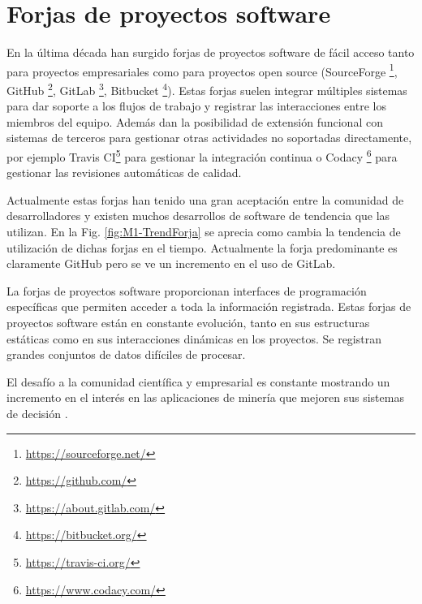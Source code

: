 \section{Forjas de proyectos software}

En la última década han surgido forjas de proyectos software de fácil acceso tanto para proyectos empresariales como para proyectos open source (SourceForge \footnote{\url{https://sourceforge.net/}}, GitHub \footnote{\url{https://github.com/}}, GitLab \footnote{\url{https://about.gitlab.com/}}, Bitbucket  \footnote{\url{https://bitbucket.org/}}).  Estas forjas suelen integrar múltiples sistemas para dar soporte a los flujos de trabajo y registrar las interacciones entre los miembros del equipo. Además dan la posibilidad de extensión funcional con sistemas de terceros para gestionar otras actividades no soportadas directamente, por ejemplo Travis CI\footnote{\url{https://travis-ci.org/}} para gestionar la integración continua o Codacy \footnote{\url{https://www.codacy.com/}} para gestionar las revisiones automáticas de calidad.

Actualmente estas forjas han tenido una gran aceptación entre la comunidad de desarrolladores y existen muchos desarrollos de software de tendencia que las utilizan. En la Fig. \ref{fig:M1-TrendForja} se aprecia como cambia la tendencia de utilización de dichas forjas en el tiempo. Actualmente la forja predominante es claramente GitHub pero se ve un incremento en el uso de GitLab.


La forjas de proyectos software proporcionan interfaces de programación específicas que permiten acceder a toda la información registrada. Estas forjas de proyectos software están en constante evolución, tanto en sus estructuras estáticas como en sus interacciones dinámicas en los proyectos. Se registran grandes conjuntos de datos difíciles de procesar.

El  desafío a la comunidad científica y empresarial  es constante mostrando un incremento en el interés en las aplicaciones de minería que mejoren sus sistemas de decisión \cite{Guemes-Pena2018}.

